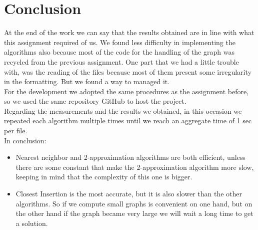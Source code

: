 \section{Conclusion}

At the end of the work we can say that the results obtained are in line with what this assignment required of us.
We found less difficulty in implementing the algorithms also because most of the code for the handling of the graph was recycled from the previous assignment.
One part that we had a little trouble with, was the reading of the files because most of them present some irregularity in the formatting. But we found a way to managed it.\\
For the development we adopted the same procedures as the assignment before, so we used the same repository GitHub to host the project.\\
Regarding the measurements and the results we obtained, in this occasion we repeated each algorithm multiple times until we reach an  aggregate time of 1 sec per file.\\
In conclusion:
\begin{itemize}
    \item Nearest neighbor and 2-approximation algorithms are both efficient, unless there are some constant that make the 2-approximation algorithm more slow, keeping in mind that the complexity of this one is bigger.
    \item Closest Insertion is the most accurate, but it is also slower than the other algorithms. So if we compute small graphs is convenient on one hand, but on the other hand if the graph became very large we will wait a long time to get a solution.
\end{itemize}
